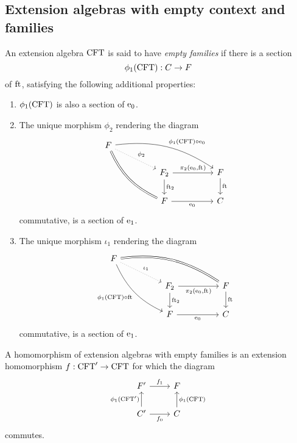 \subsection{Extension algebras with empty context and families}

\begin{defn}
An extension algebra $\mathrm{CFT}$ is said to have \emph{empty families} if there
is a section
\begin{equation*}
\phi_1(\mathrm{CFT}):C\to F
\end{equation*}
of $\mathrm{ft}_{}$, satisfying the following additional properties:
\begin{enumerate}
\item $\phi_1(\mathrm{CFT})$ is also a section of $\mathrm{e}_{0}$.
\item The unique morphism $\phi_2$ rendering the diagram
\begin{equation*}
\begin{tikzcd}[column sep=huge]
\stesysf
  \ar[bend left=20]{drr}{\phi_1(\stesys)\circ\ectxext}
  \ar[equals,bend right=20]{ddr}
  \ar[dotted]{dr}{\phi_2}
  \\
  {}&
\stesysf_2
  \ar{d}{\eft[2]}
  \ar{r}{\pullbackpr{2}{\ectxext}{\eft}}
  &
\stesysf
  \ar{d}{\eft}
  \\
  {}&
\stesysf
  \ar{r}[swap]{\ectxext}
  &
\stesysc
\end{tikzcd}
\end{equation*}
commutative, is a section of $\mathrm{e}_{1}$.
\item The unique morphism $\iota_1$ rendering the diagram
\begin{equation*}
\begin{tikzcd}[column sep=huge]
\stesysf
  \ar[equals,bend left=20]{drr}
  \ar[bend right=20]{ddr}[swap]{\phi_1(\stesys)\circ\eft}
  \ar[dotted]{dr}{\iota_1}
  \\
  {}&
\stesysf_2
  \ar{d}{\eft[2]}
  \ar{r}[swap]{\pullbackpr{2}{\ectxext}{\eft}}
  &
\stesysf
  \ar{d}{\eft}
  \\
  {}&
\stesysf
  \ar{r}[swap]{\ectxext}
  &
\stesysc
\end{tikzcd}
\end{equation*}
commutative, is a section of $\mathrm{e}_{1}$.
\end{enumerate}
\end{defn}

\begin{defn}
A homomorphism of extension algebras with empty families is an extension
homomorphism $f:\mathrm{CFT}'\to\mathrm{CFT}$ for which the diagram
\begin{equation*}
\begin{tikzcd}
\stesysf'
  \ar{r}{f_1}
  &
\stesysf
  \\
\stesysc'
  \ar{u}{\phi_1(\stesys')}
  \ar{r}[swap]{f_0}
  &
\stesysc
  \ar{u}[swap]{\phi_1(\stesys)}
\end{tikzcd}
\end{equation*}
commutes.
\end{defn}

